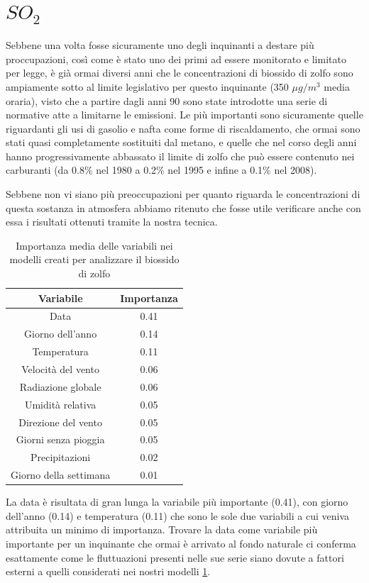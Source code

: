 \documentclass[a4paper,12pt]{report}
\begin{document}
\section{$SO_2$}
Sebbene una volta fosse sicuramente uno degli inquinanti a destare più proccupazioni, così come è stato uno dei primi ad essere monitorato e limitato per legge, è già ormai diversi anni che le concentrazioni di biossido di zolfo sono ampiamente sotto al limite legislativo per questo inquinante (350 $\mu g/m^3$ media oraria), visto che a partire dagli anni 90 sono state introdotte una serie di normative atte a limitarne le emissioni. Le più importanti sono sicuramente quelle riguardanti gli usi di gasolio e nafta come forme di riscaldamento, che ormai sono stati quasi
completamente sostituiti dal metano, e quelle che nel corso degli anni hanno progressivamente abbassato il limite di zolfo che può essere contenuto nei carburanti (da 0.8\% nel 1980 a 0.2\% nel 1995 e infine a 0.1\% nel 2008).

Sebbene non vi siano più preoccupazioni per quanto riguarda le concentrazioni di questa sostanza in atmosfera abbiamo ritenuto che fosse utile verificare anche con essa i risultati ottenuti tramite la nostra tecnica. 

\begin{table}[h!]
\centering
\begin{tabular}{ |c c| }
	\hline
	Variabile & Importanza \\
	\hline
	Data & 0.41 \\
	Giorno dell'anno & 0.14 \\
	Temperatura & 0.11 \\
	Velocità del vento & 0.06 \\
	Radiazione globale & 0.06 \\
	Umidità relativa & 0.05 \\
	Direzione del vento & 0.05 \\
	Giorni senza pioggia & 0.05 \\
	Precipitazioni & 0.02 \\
	Giorno della settimana & 0.01 \\
	\hline
\end{tabular}
\caption{Importanza media delle variabili nei modelli creati per analizzare il biossido di zolfo}
\label{table:importanza_so2}
\end{table}

La data è risultata di gran lunga la variabile più importante (0.41), con giorno dell'anno (0.14) e temperatura (0.11) che sono le sole due variabili a cui veniva attribuita un minimo di importanza. Trovare la data come variabile più importante per un inquinante che ormai è arrivato al fondo naturale ci conferma esattamente come le fluttuazioni presenti nelle sue serie siano dovute a fattori esterni a quelli considerati nei nostri modelli \ref{table:importanza_so2}.
\end{document}
